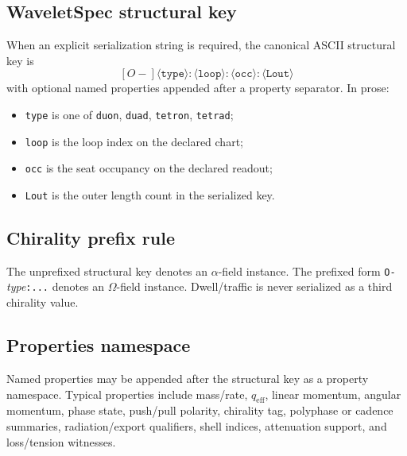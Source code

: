\subsection{WaveletSpec structural key}
When an explicit serialization string is required, the canonical ASCII structural key is
\[
[O\!-]\langle \texttt{type}\rangle:\langle \texttt{loop}\rangle:\langle \texttt{occ}\rangle:\langle \texttt{Lout}\rangle
\]
with optional named properties appended after a property separator. In prose:
\begin{itemize}[leftmargin=1.5em]
  \item \texttt{type} is one of \texttt{duon}, \texttt{duad}, \texttt{tetron}, \texttt{tetrad};
  \item \texttt{loop} is the loop index on the declared chart;
  \item \texttt{occ} is the seat occupancy on the declared readout;
  \item \texttt{Lout} is the outer length count in the serialized key.
\end{itemize}

\subsection{Chirality prefix rule}
The unprefixed structural key denotes an $\alpha$-field instance. The prefixed form
\texttt{O-}\emph{type}\texttt{:...}
denotes an $\Omega$-field instance. Dwell/traffic is never serialized as a third chirality value.

\subsection{Properties namespace}
Named properties may be appended after the structural key as a property namespace. Typical properties include mass/rate, $q_{\mathrm{eff}}$, linear momentum, angular momentum, phase state, push/pull polarity, chirality tag, polyphase or cadence summaries, radiation/export qualifiers, shell indices, attenuation support, and loss/tension witnesses.

